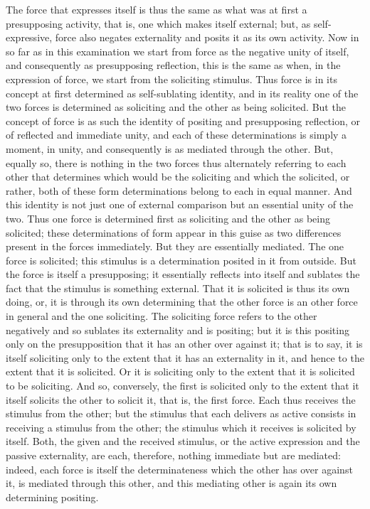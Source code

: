 The force that expresses itself is thus the same as what was at first a
presupposing activity, that is, one which makes itself external; but, as self-
expressive, force also negates externality and posits it as its own activity.
Now in so far as in this examination we start from force as the negative
unity of itself, and consequently as presupposing reflection, this is the same
as when, in the expression of force, we start from the soliciting stimulus.
Thus force is in its concept at first determined as self-sublating identity, and
in its reality one of the two forces is determined as soliciting and the other
as being solicited. But the concept of force is as such the identity of positing
and presupposing reflection, or of reflected and immediate unity, and each
of these determinations is simply a moment, in unity, and consequently
is as mediated through the other. But, equally so, there is nothing in the
two forces thus alternately referring to each other that determines which
would be the soliciting and which the solicited, or rather, both of these
form determinations belong to each in equal manner. And this identity is
not just one of external comparison but an essential unity of the two.
Thus one force is determined first as soliciting and the other as being
solicited; these determinations of form appear in this guise as two differences
present in the forces immediately. But they are essentially mediated. The
one force is solicited; this stimulus is a determination posited in it from
outside. But the force is itself a presupposing; it essentially reflects into
itself and sublates the fact that the stimulus is something external. That
it is solicited is thus its own doing, or, it is through its own determining
that the other force is an other force in general and the one soliciting. The
soliciting force refers to the other negatively and so sublates its externality
and is positing; but it is this positing only on the presupposition that it has
an other over against it; that is to say, it is itself soliciting only to the extent
that it has an externality in it, and hence to the extent that it is solicited.
Or it is soliciting only to the extent that it is solicited to be soliciting. And
so, conversely, the first is solicited only to the extent that it itself solicits the
other to solicit it, that is, the first force. Each thus receives the stimulus from
the other; but the stimulus that each delivers as active consists in receiving
a stimulus from the other; the stimulus which it receives is solicited by
itself. Both, the given and the received stimulus, or the active expression
and the passive externality, are each, therefore, nothing immediate but are
mediated: indeed, each force is itself the determinateness which the other
has over against it, is mediated through this other, and this mediating other
is again its own determining positing.

